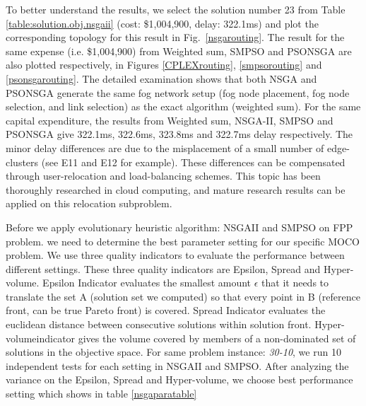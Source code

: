 \documentclass[10pt,journal,compsoc]{IEEEtran}
\newcommand{\Fig}[1]{Fig.~\ref{#1}}
\begin{document}
 
To better understand the results, we select the solution number 23 from Table \ref{table:solution.obj.nsgaii} (cost: \$1,004,900, delay: 322.1ms) and plot the corresponding topology for this result in \Fig{nsgarouting}. The result for the same expense (i.e. \$1,004,900) from Weighted sum, SMPSO and PSONSGA are also plotted respectively, in Figures \ref{CPLEXrouting}, \ref{smpsorouting} and \ref{psonsgarouting}. The detailed examination shows that both NSGA and PSONSGA generate the same fog network setup (fog node placement, fog node selection, and link selection) as the exact algorithm (weighted sum). For the same capital expenditure, the results from Weighted sum, NSGA-II, SMPSO and PSONSGA give 322.1ms, 322.6ms, 323.8ms and 322.7ms delay respectively. The minor delay differences are due to the misplacement of a small number of edge-clusters (see E11 and E12 for example). These differences can be compensated through user-relocation and load-balancing schemes. This topic has been thoroughly researched in cloud computing, and mature research results can be applied on this relocation subproblem.




\iffalse
Before we apply evolutionary heuristic algorithm: NSGAII \cite{Deb:2002:FEM:2221359.2221582} and SMPSO\cite{smpso} on FPP problem. 
we need to determine the best parameter setting for our specific MOCO problem. We use three quality indicators to evaluate the performance between different settings. 
These three quality indicators are Epsilon\cite{Zitzler:2003:PAM:2221365.2221632}, Spread\cite{Deb:2002:FEM:2221359.2221582} and Hyper-volume\cite{Auger:2009:THI:1527125.1527138}. 
Epsilon Indicator \cite{Zitzler:2003:PAM:2221365.2221632} evaluates the smallest amount $\epsilon$ that it needs to translate the set A (solution set we computed) so that every point in B (reference front, can be true Pareto front) is covered.
Spread Indicator evaluates the euclidean distance between consecutive solutions within solution front.
Hyper-volume\cite{Auger:2009:THI:1527125.1527138}indicator gives the volume covered by members of a non-dominated set of solutions in the objective space.
For same problem instance: \textit{30-10}, we run 10 independent tests for each setting in NSGAII and SMPSO. After analyzing the variance on the Epsilon, Spread and Hyper-volume, we choose best performance setting which shows in table \ref{nsgaparatable}
\end{document}
